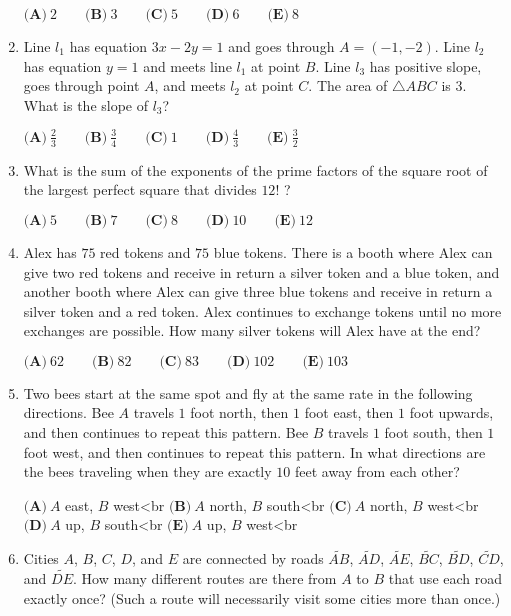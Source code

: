 \documentclass{article}
\begin{document}
\begin{enumerate}[label=\arabic*., itemsep=0.5em]
\(\textbf{(A)}\ 2 \qquad \textbf{(B)}\ 3 \qquad \textbf{(C)}\ 5 \qquad \textbf{(D)}\ 6 \qquad \textbf{(E)}\ 8\)\par \vspace{0.5em}\item Line \(l_1\) has equation \(3x - 2y = 1\) and goes through \(A = (-1, -2)\). Line \(l_2\) has equation \(y = 1\) and meets line \(l_1\) at point \(B\). Line \(l_3\) has positive slope, goes through point \(A\), and meets \(l_2\) at point \(C\). The area of \(\triangle ABC\) is \(3\). What is the slope of \(l_3\)?

\(\textbf{(A)}\ \frac{2}{3} \qquad \textbf{(B)}\ \frac{3}{4} \qquad \textbf{(C)}\ 1 \qquad \textbf{(D)}\ \frac{4}{3} \qquad \textbf{(E)}\ \frac{3}{2}\)\par \vspace{0.5em}\item What is the sum of the exponents of the prime factors of the square root of the largest perfect square that divides \(12!\) ?

\(\textbf{(A)}\ 5 \qquad \textbf{(B)}\ 7 \qquad \textbf{(C)}\ 8 \qquad \textbf{(D)}\ 10 \qquad \textbf{(E)}\ 12 \)\par \vspace{0.5em}\item Alex has \(75\) red tokens and \(75\) blue tokens. There is a booth where Alex can give two red tokens and receive in return a silver token and a blue token, and another booth where Alex can give three blue tokens and receive in return a silver token and a red token. Alex continues to exchange tokens until no more exchanges are possible. How many silver tokens will Alex have at the end?

\(\textbf{(A)}\ 62 \qquad \textbf{(B)}\ 82 \qquad \textbf{(C)}\ 83 \qquad \textbf{(D)}\ 102 \qquad \textbf{(E)}\ 103\)\par \vspace{0.5em}\item Two bees start at the same spot and fly at the same rate in the following directions. Bee \(A\) travels \(1\) foot north, then \(1\) foot east, then \(1\) foot upwards, and then continues to repeat this pattern. Bee \(B\) travels \(1\) foot south, then \(1\) foot west, and then continues to repeat this pattern. In what directions are the bees traveling when they are exactly \(10\) feet away from each other?

\(\textbf{(A)}\ A\) east, \(B\) west<br \>\(\textbf{(B)}\ A\) north, \(B\) south<br \>\(\textbf{(C)}\ A\) north, \(B\) west<br \>\(\textbf{(D)}\ A\) up, \(B\) south<br \>\(\textbf{(E)}\ A\) up, \(B\) west<br \>\par \vspace{0.5em}\item Cities \(A\), \(B\), \(C\), \(D\), and \(E\) are connected by roads \(\widetilde{AB}\), \(\widetilde{AD}\), \(\widetilde{AE}\), \(\widetilde{BC}\), \(\widetilde{BD}\), \(\widetilde{CD}\), and \(\widetilde{DE}\). How many different routes are there from \(A\) to \(B\) that use each road exactly once? (Such a route will necessarily visit some cities more than once.)


\end{enumerate}
\end{document}
